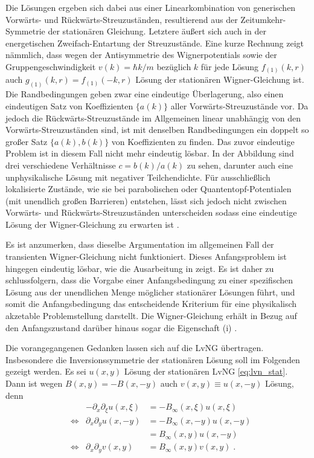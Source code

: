 Die Lösungen ergeben sich dabei aus einer Linearkombination von generischen Vorwärts- und Rückwärts-Streuzuständen, resultierend aus der Zeitumkehr-Symmetrie der stationären Gleichung. Letztere äußert sich auch in der energetischen Zweifach-Entartung der Streuzustände. Eine kurze Rechnung zeigt nämmlich, dass wegen der Antisymmetrie des Wignerpotentials sowie der Gruppengeschwindigkeit $v(k) = \hbar k/m$ bezüglich $k$ für jede Lösung $f_{(1)}(k,r)$ auch ${g_{(1)}(k,r) = f_{(1)}(-k,r)}$ Lösung der stationären Wigner-Gleichung ist. Die Randbedingungen geben zwar eine eindeutige Überlagerung, also einen eindeutigen Satz von Koeffizienten $\{a(k)\}$  aller Vorwärts-Streuzustände vor. Da jedoch die Rückwärts-Streuzustände im Allgemeinen linear unabhängig von den Vorwärts-Streuzuständen sind, ist mit denselben Randbedingungen ein doppelt so großer Satz $\{a(k),b(k)\}$ von Koeffizienten zu finden. Das zuvor eindeutige Problem ist in diesem Fall nicht mehr eindeutig lösbar. In der Abbildung sind drei verschiedene Verhältnisse $c=b(k)/a(k)$ zu sehen, darunter auch eine unphysikalische Lösung mit negativer Teilchendichte. Für ausschließlich lokalisierte Zustände, wie sie bei parabolischen oder Quantentopf-Potentialen (mit unendlich großen Barrieren) entstehen, lässt sich jedoch nicht zwischen Vorwärts- und Rückwärts-Streuzuständen unterscheiden sodass eine eindeutige Lösung der Wigner-Gleichung zu erwarten ist \cite{failure}.

Es ist anzumerken, dass dieselbe Argumentation  im allgemeinen Fall der transienten Wigner-Gleichung nicht funktioniert. Dieses Anfangsproblem ist hingegen eindeutig lösbar, wie die Ausarbeitung in \cite{dimov2015boundary} zeigt. Es ist daher zu schlussfolgern, dass die Vorgabe einer Anfangsbedingung zu einer spezifischen Lösung aus der unendlichen Menge möglicher stationärer Lösungen führt, und somit die Anfangsbedingung das entscheidende Kriterium für eine physikalisch akzetable Problemstellung darstellt. Die Wigner-Gleichung erhält in Bezug auf den Anfangszustand darüber hinaus sogar die Eigenschaft (i) \cite{dimov2015boundary}.

Die vorangegangenen Gedanken lassen sich auf die LvNG übertragen. Insbesondere die Inversionssymmetrie der stationären Lösung soll im Folgenden gezeigt werden. Es sei $u(x,y)$ Lösung der stationären LvNG \eqref{eq:lvn_stat}. Dann ist wegen $B(x,y)=-B(x,-y)$ auch $v(x,y)\equiv u(x,-y)$ Lösung, denn
\begin{align*}
  & &-\partial_x \partial_{\xi} u(x,{\xi}) &= - B_{\infty}(x,{\xi})u(x,{\xi}) \\
  &\Leftrightarrow &\partial_x \partial_y u(x,-y) &= - B_{\infty}(x,-y)u(x,-y) \\
  & & &=  B_{\infty}(x,y)u(x,-y) \\
  &\Leftrightarrow &\partial_x \partial_y v(x,y) &=  B_{\infty}(x,y)v(x,y) \; .
\end{align*}


